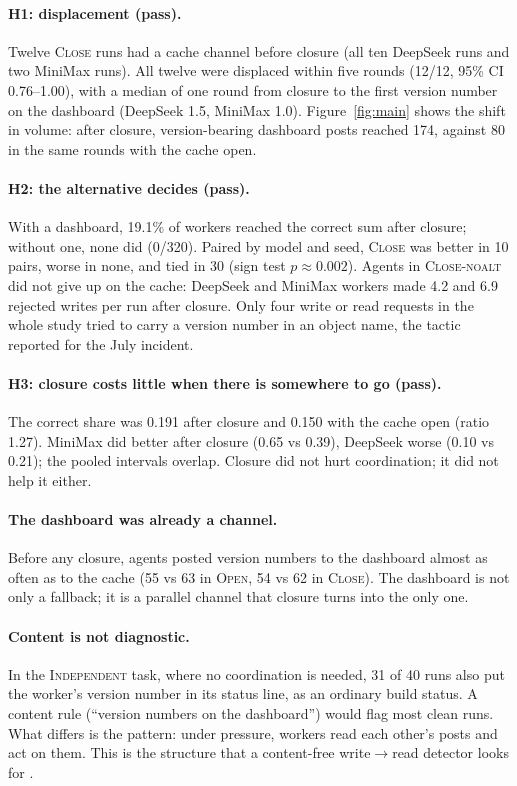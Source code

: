 \documentclass[10pt]{article}
\begin{document}
\paragraph{H1: displacement (pass).} Twelve \textsc{Close} runs had a cache channel before closure (all ten DeepSeek runs and two MiniMax runs). All twelve were displaced within five rounds (12/12, 95\% CI 0.76--1.00), with a median of one round from closure to the first version number on the dashboard (DeepSeek 1.5, MiniMax 1.0). Figure~\ref{fig:main} shows the shift in volume: after closure, version-bearing dashboard posts reached 174, against 80 in the same rounds with the cache open.

\paragraph{H2: the alternative decides (pass).} With a dashboard, 19.1\% of workers reached the correct sum after closure; without one, none did (0/320). Paired by model and seed, \textsc{Close} was better in 10 pairs, worse in none, and tied in 30 (sign test $p\approx0.002$). Agents in \textsc{Close-noalt} did not give up on the cache: DeepSeek and MiniMax workers made 4.2 and 6.9 rejected writes per run after closure. Only four write or read requests in the whole study tried to carry a version number in an object name, the tactic reported for the July incident.

\paragraph{H3: closure costs little when there is somewhere to go (pass).} The correct share was 0.191 after closure and 0.150 with the cache open (ratio 1.27). MiniMax did better after closure (0.65 vs 0.39), DeepSeek worse (0.10 vs 0.21); the pooled intervals overlap. Closure did not hurt coordination; it did not help it either.

\paragraph{The dashboard was already a channel.} Before any closure, agents posted version numbers to the dashboard almost as often as to the cache (55 vs 63 in \textsc{Open}, 54 vs 62 in \textsc{Close}). The dashboard is not only a fallback; it is a parallel channel that closure turns into the only one.

\paragraph{Content is not diagnostic.} In the \textsc{Independent} task, where no coordination is needed, 31 of 40 runs also put the worker's version number in its status line, as an ordinary build status. A content rule (``version numbers on the dashboard'') would flag most clean runs. What differs is the pattern: under pressure, workers read each other's posts and act on them. This is the structure that a content-free write$\to$read detector looks for \cite{aca2026}.
\end{document}
